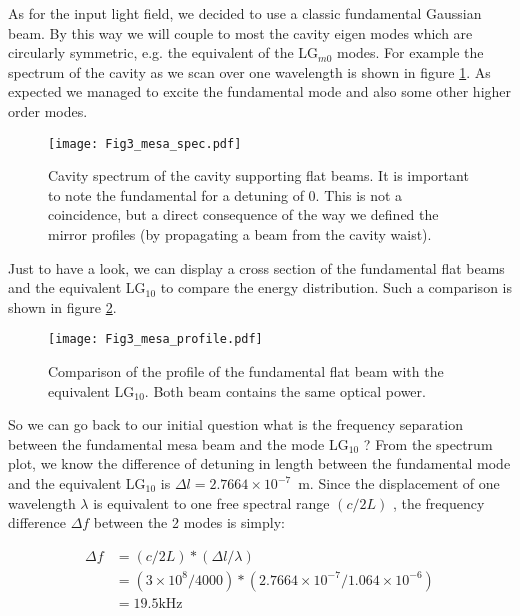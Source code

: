 As for the input light field, we decided to use a classic fundamental Gaussian beam. By this way we will couple to most the cavity eigen modes which are circularly symmetric, e.g. the equivalent of the LG$_{m0}$ modes. For example the spectrum of the cavity as we scan over one wavelength is shown in figure \ref{fig3_mesa_spec}. As expected we managed to excite the fundamental mode and also some other higher order modes.

\begin{figure}
\begin{center}
\texttt{[image: Fig3\_mesa\_spec.pdf]}
\end{center}
\caption{Cavity spectrum of the cavity supporting flat beams. It is important to note the fundamental for a detuning of 0. This is not a coincidence, but a direct consequence of the way we defined the mirror profiles (by propagating a beam from the cavity waist).\label{fig3_mesa_spec}}
\end{figure}

Just to have a look, we can display a cross section of the fundamental flat beams and the equivalent LG$_{10}$ to compare the energy distribution. Such a comparison is shown in figure \ref{fig3_mesa_profile}.\\

\begin{figure}
\begin{center}
\texttt{[image: Fig3\_mesa\_profile.pdf]}
\end{center}
\caption{Comparison of the profile of the fundamental flat beam with the equivalent LG$_{10}$. Both beam contains the same optical power.\label{fig3_mesa_profile}}
\end{figure}

So we can go back to our initial question what is the frequency separation between the fundamental mesa beam and the mode LG$_{10}$ ? From the spectrum plot, we know the difference of detuning in length between the fundamental mode and the equivalent LG$_{10}$ is $ \Delta l = 2.7664 \times 10^{-7}$~m. Since the displacement of one wavelength $\lambda$ is equivalent to one free spectral range $(c / 2L)$ , the frequency difference $\Delta f$ between the 2 modes is simply:

\begin{equation}
\begin{split}
\Delta f & = (c / 2L) * (\Delta l / \lambda)\\
& = (3 \times 10^8/4000)*( 2.7664 \times 10^{-7} / 1.064 \times 10^{-6}) \\
& = 19.5 \textrm{kHz}
\end{split}
\end{equation}

